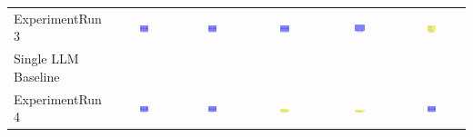\begin{table}
\begin{tabular}{@{}lccccc@{}}
    ExperimentRun 3 & \includegraphics[width=0.15\textwidth]{./run_3/png/gpt-4o_results/MicrofluidicChip.png} & \includegraphics[width=0.15\textwidth]{./run_3/png/o1-preview_results/MicrofluidicChip.png} & \includegraphics[width=0.15\textwidth]{./run_3/png/claude-3-5-sonnet-20240620_results/MicrofluidicChip.png} & \includegraphics[width=0.15\textwidth]{./run_3/png/watsonx_meta-llama_llama-3-1-70b-instruct_results/MicrofluidicChip.png} & \includegraphics[width=0.15\textwidth]{./run_3/png/watsonx_meta-llama_llama-3-405b-instruct_results/MicrofluidicChip.png} \\
    Single LLM Baseline \\
    ExperimentRun 4 & \includegraphics[width=0.15\textwidth]{./run_4/png/gpt-4o_results/MicrofluidicChip.png} & \includegraphics[width=0.15\textwidth]{./run_4/png/o1-preview_results/MicrofluidicChip.png} & \includegraphics[width=0.15\textwidth]{./run_4/png/claude-3-5-sonnet-20240620_results/MicrofluidicChip.png} & \includegraphics[width=0.15\textwidth]{./run_4/png/watsonx_meta-llama_llama-3-1-70b-instruct_results/MicrofluidicChip.png} & \includegraphics[width=0.15\textwidth]{./run_4/png/watsonx_meta-llama_llama-3-405b-instruct_results/MicrofluidicChip.png} \\

\end{tabular}
\end{table}
